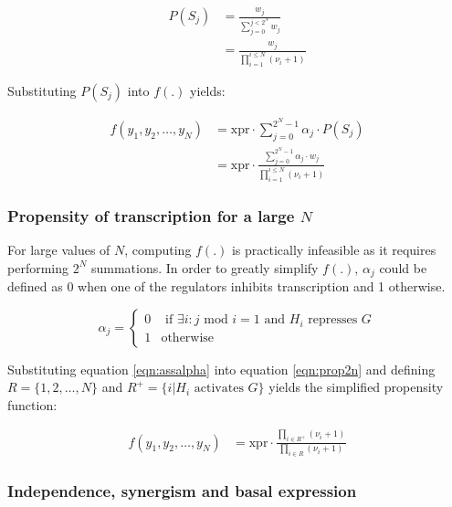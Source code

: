\documentclass[
  table,
  10pt,
  a4paper]{article}
\begin{document}
\begin{align}
P(S_j) & = \frac{w_j}{\sum_{j=0}^{j < 2^N} w_j} \\
& = \frac{w_j}{\prod_{i=1}^{i \leq N} (\nu_i + 1)}
\end{align}

Substituting \(P(S_j)\) into \(f(.)\) yields:

\begin{align}
f(y_1, y_2, \ldots, y_N) & = \text{xpr} \cdot \sum_{j = 0}^{2^N - 1} \alpha_j \cdot P(S_j) \\
& = \text{xpr} \cdot \frac{\sum_{j = 0}^{2^N - 1} \alpha_j \cdot w_j}{\prod_{i=1}^{i \leq N} (\nu_i + 1)} \label{eqn:prop2n}
\end{align}

\hypertarget{propensity-of-transcription-for-a-large-n}{%
\subsubsection{\texorpdfstring{Propensity of transcription for a large
\(N\)}{Propensity of transcription for a large N}}\label{propensity-of-transcription-for-a-large-n}}

For large values of \(N\), computing \(f(.)\) is practically infeasible
as it requires performing \(2^N\) summations. In order to greatly
simplify \(f(.)\), \(\alpha_j\) could be defined as 0 when one of the
regulators inhibits transcription and 1 otherwise.

\begin{equation}
\alpha_j = \begin{cases}
 0 & \text{ if } \exists i : j \text{ mod } i = 1 \text{ and } H_i \text{ represses } G \\
 1 & \text{otherwise}
\end{cases} \label{eqn:assalpha}
\end{equation}

Substituting equation \ref{eqn:assalpha} into equation \ref{eqn:prop2n}
and defining \(R = \{1, 2, \ldots, N\}\) and
\(R^+ = \{i | H_i \text{ activates } G\}\) yields the simplified
propensity function:

\begin{align}
f(y_1, y_2, \ldots, y_N) & = \text{xpr} \cdot \frac{\prod_{i \in R^+} (\nu_i + 1)}{\prod_{i \in R} (\nu_i + 1)}
\end{align}

\hypertarget{independence-synergism-and-basal-expression}{%
\subsubsection{Independence, synergism and basal
expression}\label{independence-synergism-and-basal-expression}}
\end{document}
